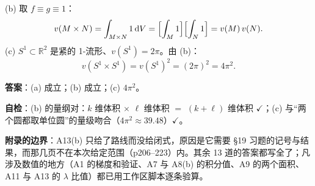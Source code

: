 \documentclass[11pt]{ctexart}
\begin{document}
(b) 取 $f\equiv g\equiv1$：
\[ v(M\times N)=\int_{M\times N}1\,\mathrm{d} V=\Bigl[\int_M1\Bigr]\Bigl[\int_N1\Bigr]=v(M)\,v(N). \]
(c) $S^1\subset\mathbb{R}^2$ 是紧的 1-流形、$v(S^1)=2\pi$。由 (b)：
\[ v(S^1\times S^1)=v(S^1)^2=(2\pi)^2=4\pi^2. \]

\textbf{答案}：(a) 成立；(b) 成立；(c) $4\pi^2$。

\textbf{自检}：(b) 的量纲对：$k$ 维体积 $\times$ $\ell$ 维体积 $=$ $(k+\ell)$ 维体积 $\checkmark$；(c) 与“两个圆都取单位圆”的量级吻合（$4\pi^2\approx39.48$）$\checkmark$。


\begin{notecall}
\textbf{附录的边界}：A13(b) 只给了路线而没给闭式，原因是它需要 §19 习题的记号与结果，而那几页不在本次给定范围（p206--223）内。其余 13 道的答案都写全了；凡涉及数值的地方（A1 的梯度和验证、A7 与 A8(b) 的积分值、A9 的两个面积、A11 与 A13 的 $\lambda$ 比值）都已用工作区脚本逐条验算。
\end{notecall}
\end{document}
